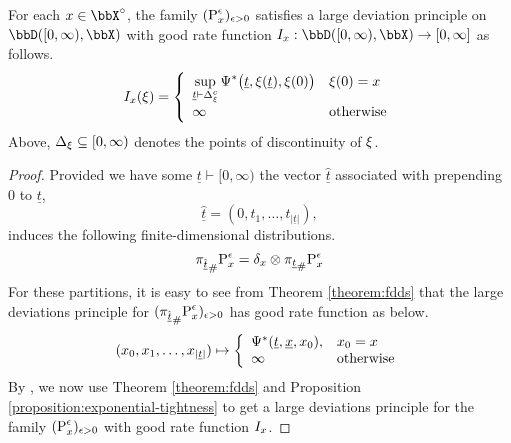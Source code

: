 \begin{theorem}
  \label{theorem:ldp}
  For each $\stateVar \in \stateSpace^\circ$, the family $(\Prb^\epsilon_\stateVar)_{\epsilon>0}$ satisfies a large deviation principle on $\pathSpace{[0,\infty)}{\stateSpace}$ with good rate function $\rf_\stateVar: \pathSpace{[0,\infty)}{\stateSpace} \rightarrow [0,\infty]$ as follows.
  \begin{equation}
    \label{eq:rf}
    \rf_\stateVar(\pathVar) = \left\{\begin{array}{ll}
      \displaystyle\sup_{\underline t\vdash \Delta_\pathVar^c} \aff^*\big(\underline t, \pathVar(\underline t), \pathVar(0)\big) & \pathVar(0) = \stateVar \\
      \infty & \text{otherwise}
    \end{array}\right.
  \end{equation}
  Above, $\Delta_\pathVar \subseteq [0,\infty)$ denotes the points of discontinuity of $\pathVar$.
\end{theorem}

\begin{proof}
  \label{proof:theorem:ldp}
  Provided we have some $\underline t \vdash [0,\infty)$ the vector $\hat{\underline t}$ associated with prepending $0$ to $\underline t$, 
  \begin{equation*}
    \hat{\underline t} = (0, t_1, \ldots, t_{|\underline t|}),
  \end{equation*}
  induces the following finite-dimensional distributions.
  \begin{equation*}
    \push{\Prb^\epsilon_\stateVar}{\pi_{\hat{\underline t}}} = \delta_\stateVar \otimes \push{\Prb^\epsilon_\stateVar}{\pi_{\underline t}}
  \end{equation*}
  For these partitions, it is easy to see from Theorem \ref{theorem:fdds} that the large deviations principle for $(\push{\Prb^\epsilon_\stateVar}{\pi_{\hat{\underline t}}})_{\epsilon>0}$ has good rate function as below.
  \begin{equation*}
    (\stateVar_0, \stateVar_1, \ldots, \stateVar_{|\underline t|}) \mapsto \left\{\begin{array}{ll}
      \aff^*(\underline t, \underline\stateVar, \stateVar_0), & \stateVar_0 = \stateVar \\
      \infty & \text{otherwise}
    \end{array}\right.
  \end{equation*}
  By \cite[Theorem 4.28]{feng2006}, we now use Theorem \ref{theorem:fdds} and Proposition \ref{proposition:exponential-tightness} to get a large deviations principle for the family $(\Prb^\epsilon_\stateVar)_{\epsilon>0}$ with good rate function $\rf_\stateVar$.
\end{proof}
